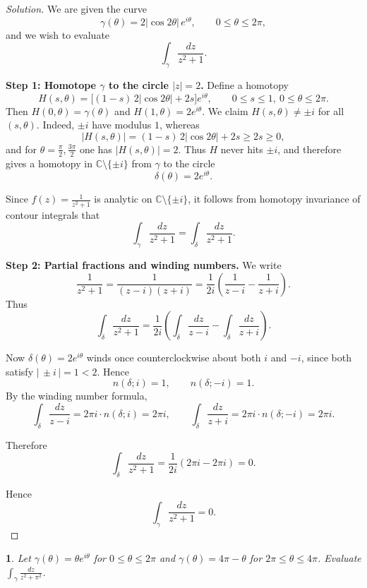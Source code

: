 \documentclass[12pt, a4paper]{report}
\theoremstyle{spaced}
\newtheorem{exercise}{}
\newcommand{\setexercise}[1]{\setcounter{exercise}{#1-1}}
\begin{document}
\begin{proof}[Solution]
	We are given the curve
	\[
		\gamma(\theta)=2|\cos 2\theta|\,e^{i\theta}, \qquad 0\le \theta\le 2\pi,
	\]
	and we wish to evaluate
	\[
		\int_\gamma \frac{dz}{z^{2}+1}.
	\]

	\textbf{Step 1: Homotope $\gamma$ to the circle $|z|=2$.}
	Define a homotopy
	\[
		H(s,\theta)
		=\big[(1-s)\,2|\cos 2\theta|+2s\big]e^{i\theta},
		\qquad 0\le s\le 1,\ 0\le\theta\le 2\pi.
	\]
	Then $H(0,\theta)=\gamma(\theta)$ and $H(1,\theta)=2e^{i\theta}$.
	We claim $H(s,\theta)\neq \pm i$ for all $(s,\theta)$.
	Indeed, $\pm i$ have modulus $1$, whereas
	\[
		|H(s,\theta)|=(1-s)\,2|\cos 2\theta|+2s\ge 2s\ge 0,
	\]
	and for $\theta=\frac{\pi}{2},\frac{3\pi}{2}$ one has $|H(s,\theta)|=2$.
	Thus $H$ never hits $\pm i$, and therefore gives a homotopy in
	$\mathbb{C}\setminus\{\pm i\}$ from $\gamma$ to the circle
	\[
		\delta(\theta)=2e^{i\theta}.
	\]

	Since $f(z)=\frac{1}{z^{2}+1}$ is analytic on $\mathbb{C}\setminus\{\pm i\}$,
	it follows from homotopy invariance of contour integrals that
	\[
		\int_\gamma \frac{dz}{z^{2}+1}
		=\int_\delta \frac{dz}{z^{2}+1}.
	\]

	\textbf{Step 2: Partial fractions and winding numbers.}
	We write
	\[
		\frac{1}{z^{2}+1}
		=\frac{1}{(z-i)(z+i)}
		=\frac{1}{2i}\left(\frac{1}{z-i}-\frac{1}{z+i}\right).
	\]
	Thus
	\[
		\int_\delta \frac{dz}{z^{2}+1}
		=\frac{1}{2i}
		\left(
		\int_\delta \frac{dz}{z-i}
		-
		\int_\delta \frac{dz}{z+i}
		\right).
	\]

	Now $\delta(\theta)=2e^{i\theta}$ winds once counterclockwise about both
	$i$ and $-i$, since both satisfy $|\,\pm i\,|=1<2$.  Hence
	\[
		n(\delta;i)=1, \qquad n(\delta;-i)=1.
	\]
	By the winding number formula,
	\[
		\int_\delta \frac{dz}{z-i}=2\pi i\cdot n(\delta;i)=2\pi i,
		\qquad
		\int_\delta \frac{dz}{z+i}=2\pi i\cdot n(\delta;-i)=2\pi i.
	\]

	Therefore
	\[
		\int_\delta \frac{dz}{z^{2}+1}
		=\frac{1}{2i}(2\pi i-2\pi i)=0.
	\]

	Hence
	\[
		\int_\gamma \frac{dz}{z^{2}+1}=0.
	\]
\end{proof}


\setexercise{6}
\begin{exercise}
	Let $\gamma(\theta) = \theta e^{i\theta}$ for $0 \le \theta \le 2\pi$ and $\gamma(\theta)= 4\pi - \theta$ for $2\pi \le \theta \le 4\pi$.
	Evaluate $\displaystyle \int_{\gamma} \frac{dz}{z^{2} + \pi^{2}}$.
\end{exercise}
\end{document}
